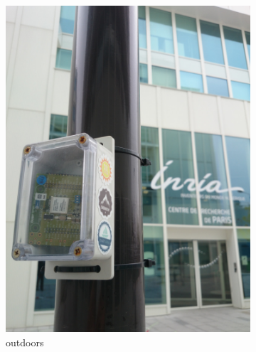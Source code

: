 \documentclass{elsarticle}
\begin{document}
\begin{figure}
    \centering
    \begin{subfigure}[h]{0.49\textwidth}
        \includegraphics[width=\textwidth]{smartbuilding_outdoor}
        \caption{outdoors}
    \end{subfigure}
    \begin{subfigure}[h]{0.49\textwidth}  

\end{subfigure}
\end{figure}
\end{document}
